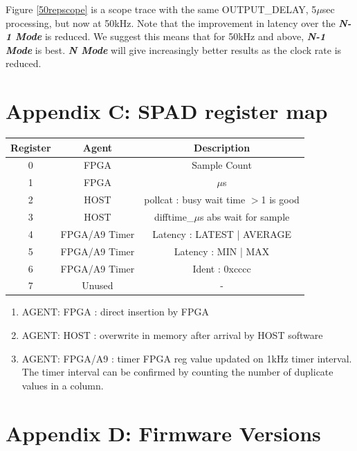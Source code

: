 \documentclass{article}
\begin{document}
Figure \ref{50repscope} is a scope trace with the same OUTPUT\_DELAY, 5$\mu$sec processing, but now at 50kHz.
Note that the improvement in latency over the \textit{\textbf{N-1 Mode}} is reduced.
We suggest this means that for 50kHz and above, \textit{\textbf{N-1 Mode}} is best.
\textit{\textbf{N Mode}} will give increasingly better results as the clock rate is reduced.

\newpage

\section{Appendix C: SPAD register map} \label{spadregmap}

\begin{center}
	\begin{tabular}{||c c c||} 
		\hline
		Register & Agent & Description \\ \hline\hline\hline
		0 & FPGA & Sample Count \\
		\hline
		1 & FPGA & $\mu$s \\
		\hline
		2 & HOST & pollcat : busy wait time $>$1 is good \\
		\hline
		3 & HOST & difftime\_$\mu$s abs wait for sample \\ [1ex] 
		\hline
		4 & FPGA/A9 Timer & Latency : LATEST | AVERAGE \\
		\hline
		5 & FPGA/A9 Timer & Latency : MIN | MAX \\
		\hline
		6 & FPGA/A9 Timer & Ident : 0xcccc \\
		\hline
		7 & Unused & - \\
		\hline
	\end{tabular}
\end{center}

\begin{enumerate}
	\item AGENT: FPGA    : direct insertion by FPGA
	\item AGENT: HOST    : overwrite in memory after arrival by HOST software
	\item AGENT: FPGA/A9 : timer FPGA reg value updated on 1kHz timer interval. The timer interval can be confirmed by counting the number of duplicate values in a column.
\end{enumerate}

\newpage

\section{Appendix D: Firmware Versions} \label{firmware}
\end{document}
